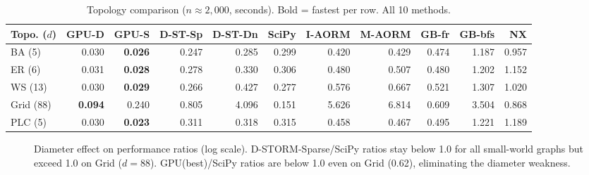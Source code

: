 \documentclass[journal]{IEEEtran}
\begin{document}
\begin{table}[t]
\centering
\caption{Topology comparison ($n\!\approx\!2{,}000$, seconds). Bold = fastest per row. All 10 methods.}
\label{tab:topo}
\setlength{\tabcolsep}{3pt}
\begin{tabular}{@{}lrrrrrrrrrr@{}}
\toprule
\textbf{Topo.} ($d$) & \textbf{GPU-D} & \textbf{GPU-S} & \textbf{D-ST-Sp} & \textbf{D-ST-Dn} & \textbf{SciPy} & \textbf{I-AORM} & \textbf{M-AORM} & \textbf{GB-fr} & \textbf{GB-bfs} & \textbf{NX} \\
\midrule
BA (5) & 0.030 & \textbf{0.026} & 0.247 & 0.285 & 0.299 & 0.420 & 0.429 & 0.474 & 1.187 & 0.957 \\
ER (6) & 0.031 & \textbf{0.028} & 0.278 & 0.330 & 0.306 & 0.480 & 0.507 & 0.480 & 1.202 & 1.152 \\
WS (13) & 0.030 & \textbf{0.029} & 0.266 & 0.427 & 0.277 & 0.576 & 0.667 & 0.521 & 1.307 & 1.020 \\
Grid (88) & \textbf{0.094} & 0.240 & 0.805 & 4.096 & 0.151 & 5.626 & 6.814 & 0.609 & 3.504 & 0.868 \\
PLC (5) & 0.030 & \textbf{0.023} & 0.311 & 0.318 & 0.315 & 0.458 & 0.467 & 0.495 & 1.221 & 1.189 \\
\bottomrule
\end{tabular}
\end{table}

\begin{figure}[t]
\centering
{}
\caption{Diameter effect on performance ratios (log scale). D-STORM-Sparse/SciPy ratios stay below 1.0 for all small-world graphs but exceed 1.0 on Grid ($d\!=\!88$). GPU(best)/SciPy ratios are below 1.0 even on Grid (0.62), eliminating the diameter weakness.}
\label{fig:diam}
\end{figure}
\end{document}
